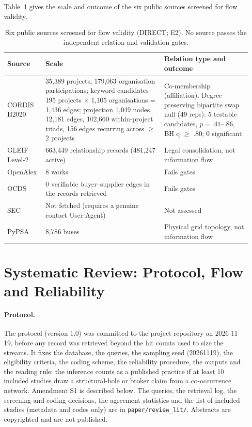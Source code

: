 Table~\ref{tab:app_sources} gives the scale and outcome of the six public sources screened for flow validity.

\begin{table}[tbp]
\centering
\caption{Six public sources screened for flow validity (DIRECT; E2). No source passes the independent-relation and validation gates.}
\label{tab:app_sources}
\footnotesize
\begin{tabular}{p{2.2cm}p{6.6cm}p{5.6cm}}
\toprule
Source & Scale & Relation type and outcome \tabularnewline
\midrule
\raggedright CORDIS H2020 & \raggedright 35,389 projects; 179,063 organisation participations; keyword candidates 195 projects $\times$ 1,105 organisations = 1,436 edges; projection 1,049 nodes, 12,181 edges, 102,660 within-project triads, 156 edges recurring across $\geq$2 projects & \raggedright Co-membership (affiliation). Degree-preserving bipartite swap null (49 reps): 5 testable candidates, $p=.41$--$.86$, BH q $\geq$ .80; 0 significant \tabularnewline
\raggedright GLEIF Level-2 & \raggedright 663,449 relationship records (481,247 active) & \raggedright Legal consolidation, not information flow \tabularnewline
\raggedright OpenAlex & \raggedright 8 works & \raggedright Fails gates \tabularnewline
\raggedright OCDS & \raggedright 0 verifiable buyer--supplier edges in the records retrieved & \raggedright Fails gates \tabularnewline
\raggedright SEC & \raggedright Not fetched (requires a genuine contact User-Agent) & \raggedright Not assessed \tabularnewline
\raggedright PyPSA & \raggedright 8,786 buses & \raggedright Physical grid topology, not information flow \tabularnewline
\bottomrule
\end{tabular}
\end{table}

\section{Systematic Review: Protocol, Flow and Reliability}
\label{app:review}

\paragraph{Protocol.} The protocol (version 1.0) was committed to the project repository on 2026-11-19, before any record was retrieved beyond the hit counts used to size the streams. It fixes the database, the queries, the sampling seed (20261119), the eligibility criteria, the coding scheme, the reliability procedure, the outputs and the reading rule: the inference counts as a published practice if at least 10 included studies draw a structural-hole or broker claim from a co-occurrence network. Amendment S1 is described below. The queries, the retrieval log, the screening and coding decisions, the agreement statistics and the list of included studies (metadata and codes only) are in \texttt{paper/review\_lit/}. Abstracts are copyrighted and are not published.

